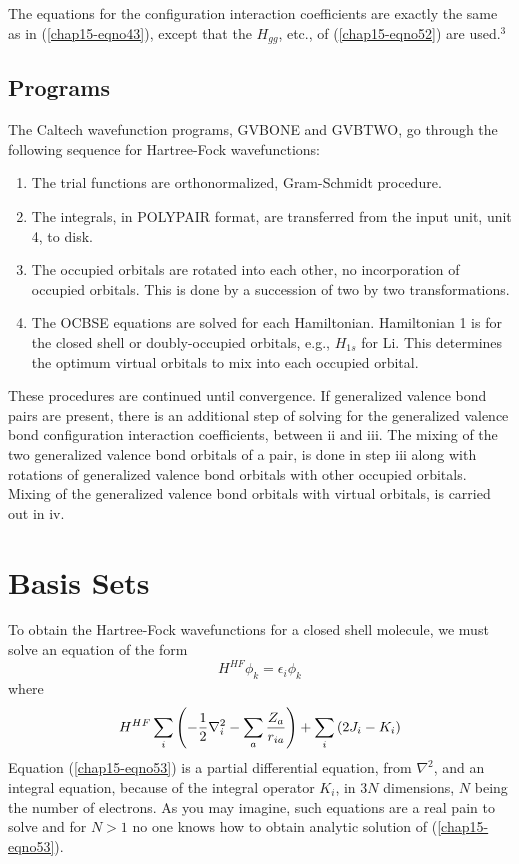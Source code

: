 The equations for the configuration interaction coefficients are
exactly the same as in (\ref{chap15-eqno43}), except that the
$H_{gg}$, etc., of (\ref{chap15-eqno52}) are used.$^3$

\subsection{Programs}

The Caltech wavefunction programs, GVBONE and GVBTWO, go
through the following sequence for Hartree-Fock wavefunctions:
\begin{enumerate}
\item The trial functions are orthonormalized, Gram-Schmidt procedure.

\item The integrals, in POLYPAIR format, are transferred from the input
unit, unit 4, to disk.

\item The occupied orbitals are rotated into each other, no 
incorporation of occupied orbitals.  This is done by a succession of 
two by two transformations.

\item The OCBSE equations are solved for each Hamiltonian. Hamiltonian
1 is for the closed shell or doubly-occupied orbitals, e.g., $H_{1s}$ for Li.
This determines the optimum virtual orbitals to mix into each occupied
orbital.
\end{enumerate}

These procedures are continued until convergence. If generalized
valence bond pairs are present, there is an additional step of solving
for the generalized valence bond configuration interaction
coefficients, between ii and iii.  The mixing of the two generalized
valence bond orbitals of a pair, is done in step iii along with
rotations of generalized valence bond orbitals with other occupied
orbitals.  Mixing of the generalized valence bond orbitals with
virtual orbitals, is carried out in iv.

\section{Basis Sets}

To obtain the Hartree-Fock wavefunctions for a closed shell molecule,
we must solve an equation of the form
\begin{equation}
H^{HF} \phi_k = \epsilon_i \phi_k
\label{chap15-eqno53}
\end{equation}
where
\begin{equation}
H^{HF} \sum_{i} \left( - {1 \over 2} \nabla^2_i - \sum_{a} {Z_a \over 
r_{ia}} \right) + \sum_{i} \left( 2J_i - K_i \right)
\end{equation}
Equation (\ref{chap15-eqno53}) is a partial differential equation,
from $\nabla^2$, and an integral equation, because of the integral
operator $K_i$, in $3N$ dimensions, $N$ being the number of
electrons. As you may imagine, such equations are a real pain to solve
and for $N > 1$ no one knows how to obtain analytic solution of
(\ref{chap15-eqno53}).

